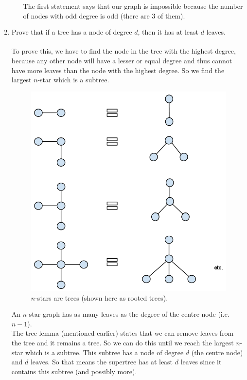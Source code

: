 \documentclass[10pt,a4paper,final]{article}
\begin{document}
\begin{enumerate}
\begin{enumerate}
The first statement says that our graph is impossible because the number of nodes with odd degree is odd (there are 3 of them).  
\end{enumerate}

\item %
Prove that if a tree has a node of degree $d$, then it has at least $d$ leaves. \\
\\
To prove this, we have to find the node in the tree with the highest degree, because
any other node will have a lesser or equal degree and thus cannot have more leaves than the node
with the highest degree. So we find the largest $n$-star which is a subtree.

\begin{figure}[h!]
  \centering
    \includegraphics[scale=0.4]{q5.png}
  \caption{$n$-stars are trees (shown here as rooted trees).}
  \label{q5}
\end{figure}

An $n$-star graph has as many leaves as the degree of the centre node (i.e. $n-1$). \\
The tree lemma (mentioned earlier) states that we can remove leaves from the tree and it remains a tree.
So we can do this until we reach the largest $n$-star which is a subtree.
This subtree has a node of degree $d$ (the centre node) and $d$ leaves. So that means the supertree
has at least $d$ leaves since it contains this subtree (and possibly more).


\end{enumerate}
\end{document}
